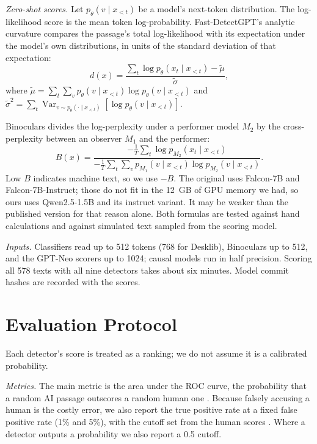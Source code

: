 \documentclass[conference]{IEEEtran}
\begin{document}
\textit{Zero-shot scores.} Let $p_\theta(v \mid x_{<t})$ be a model's next-token distribution. The log-likelihood score is the mean token log-probability. Fast-DetectGPT's analytic curvature compares the passage's total log-likelihood with its expectation under the model's own distributions, in units of the standard deviation of that expectation:
\begin{equation}
d(x)=\frac{\sum_t \log p_\theta(x_t \mid x_{<t})-\tilde\mu}{\tilde\sigma},
\end{equation}
where $\tilde\mu=\sum_t\sum_v p_\theta(v\mid x_{<t})\log p_\theta(v\mid x_{<t})$ and $\tilde\sigma^{2}=\sum_t \operatorname{Var}_{v\sim p_\theta(\cdot\mid x_{<t})}[\log p_\theta(v\mid x_{<t})]$.

Binoculars divides the log-perplexity under a performer model $M_2$ by the cross-perplexity between an observer $M_1$ and the performer:
\begin{equation}
B(x)=\frac{-\frac{1}{T}\sum_t \log p_{M_2}(x_t\mid x_{<t})}{-\frac{1}{T}\sum_t\sum_v p_{M_1}(v\mid x_{<t})\log p_{M_2}(v\mid x_{<t})}.
\end{equation}
Low $B$ indicates machine text, so we use $-B$. The original uses Falcon-7B and Falcon-7B-Instruct; those do not fit in the 12~GB of GPU memory we had, so ours uses Qwen2.5-1.5B and its instruct variant. It may be weaker than the published version for that reason alone. Both formulas are tested against hand calculations and against simulated text sampled from the scoring model.

\textit{Inputs.} Classifiers read up to 512 tokens (768 for Desklib), Binoculars up to 512, and the GPT-Neo scorers up to 1024; causal models run in half precision. Scoring all 578 texts with all nine detectors takes about six minutes. Model commit hashes are recorded with the scores.

\section{Evaluation Protocol}
Each detector's score is treated as a ranking; we do not assume it is a calibrated probability.

\textit{Metrics.} The main metric is the area under the ROC curve, the probability that a random AI passage outscores a random human one \cite{hanley}. Because falsely accusing a human is the costly error, we also report the true positive rate at a fixed false positive rate (1\% and 5\%), with the cutoff set from the human scores \cite{carlini}. Where a detector outputs a probability we also report a 0.5 cutoff.
\end{document}
